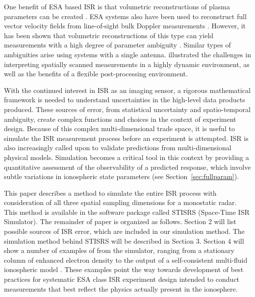 \documentclass[draft,ras]{agutex}
\begin{document}
\begin{article}
One benefit of ESA based ISR is that volumetric reconstructions of plasma parameters can be created \citep{Semeter2009738, Nicolls:2007ie, dahlgren2012di}. ESA systems also have been used to reconstruct full vector velocity fields from line-of-sight bulk Doppler measurements \citep{butler:imagingfregiondrifts,RDS:RDS20195}. However, it has been shown that volumetric reconstructions of this type can yield measurements with a high degree of parameter ambiguity \citep{Dahlgren:2012dq}. Similar types of ambiguities arise using systems with a single antenna.  \citet{Semeter:2005fo} illustrated the challenges in interpreting spatially scanned measurements in a highly dynamic environment, as well as the benefits of a flexible post-processing environment.

With the continued interest in ISR as an imaging sensor, 
a rigorous mathematical framework is needed to understand uncertainties in the high-level data products produced.  These sources of error, from statistical uncertainty and spatio-temporal ambiguity, create complex functions and choices in the context of experiment design. Because of this complex multi-dimensional trade space, it is useful to simulate the ISR measurement process before an experiment is attempted. 
ISR is also increasingly called upon to validate predictions from multi-dimensional physical models.  Simulation becomes a critical tool in this  context by providing a quantitative assessment of the observability of a predicted response, which involve subtle variations in ionospheric state parameters (see Section~\ref{sec:fullparam}).  

This paper describes a method to simulate the entire ISR process with consideration of all three spatial sampling dimensions for a monostatic radar. This method is available in the software package called STISRS (Space-Time ISR Simulator).  The remainder of paper is organized as follows. Section 2 will list possible sources of ISR error, which are included in our simulation method. The simulation method behind STISRS will be described in Section 3. Section 4 will show a number of examples of from the simulator, ranging from a stationary column of enhanced electron density to the output of a self-consistent multi-fluid ionospheric model \citep{semeter:plasmatransport2012}. These examples point the way towards development of best practices for systematic ESA class ISR experiment design intended to conduct measurements that best reflect the physics actually present in the ionosphere.

\end{article}
\end{document}
